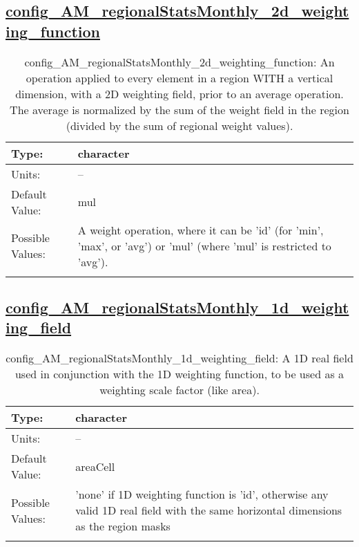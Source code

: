 \subsection[config\_AM\_regionalStatsMonthly\_2d\_weighting\_function]{\hyperref[sec:nm_tab_AM_regionalStatsMonthly]{config\_AM\_regionalStatsMonthly\_2d\_weighting\_function}}
\label{subsec:nm_sec_config_AM_regionalStatsMonthly_2d_weighting_function}
\begin{center}
\begin{longtable}{| p{2.0in} || p{4.0in} |}
    \hline
    Type: & character \\
    \hline
    Units: & -- \\
    \hline
    Default Value: & mul \\
    \hline
    Possible Values: & A weight operation, where it can be 'id' (for 'min', 'max', or 'avg') or 'mul' (where 'mul' is restricted to 'avg'). \\
    \hline
    \caption{config\_AM\_regionalStatsMonthly\_2d\_weighting\_function: An operation applied to every element in a region WITH a vertical dimension, with a 2D weighting field, prior to an average operation. The average is normalized by the sum of the weight field in the region (divided by the sum of regional weight values).}
\end{longtable}
\end{center}
\subsection[config\_AM\_regionalStatsMonthly\_1d\_weighting\_field]{\hyperref[sec:nm_tab_AM_regionalStatsMonthly]{config\_AM\_regionalStatsMonthly\_1d\_weighting\_field}}
\label{subsec:nm_sec_config_AM_regionalStatsMonthly_1d_weighting_field}
\begin{center}
\begin{longtable}{| p{2.0in} || p{4.0in} |}
    \hline
    Type: & character \\
    \hline
    Units: & -- \\
    \hline
    Default Value: & areaCell \\
    \hline
    Possible Values: & 'none' if 1D weighting function is 'id', otherwise any valid 1D real field with the same horizontal dimensions as the region masks \\
    \hline
    \caption{config\_AM\_regionalStatsMonthly\_1d\_weighting\_field: A 1D real field used in conjunction with the 1D weighting function, to be used as a weighting scale factor (like area).}
\end{longtable}
\end{center}
